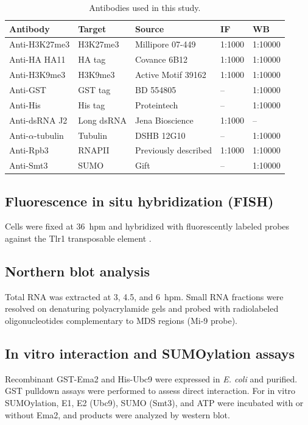 \documentclass[11pt,a4paper]{article}
\begin{document}
\begin{table}[htbp]
\centering
\caption{Antibodies used in this study.}
\label{tab:antibodies}
\small
\begin{tabular}{lllll}
\toprule
\textbf{Antibody} & \textbf{Target} & \textbf{Source} & \textbf{IF} & \textbf{WB} \\
\midrule
Anti-H3K27me3 & H3K27me3 & Millipore 07-449 & 1:1000 & 1:10000 \\
Anti-HA HA11 & HA tag & Covance 6B12 & 1:1000 & 1:10000 \\
Anti-H3K9me3 & H3K9me3 & Active Motif 39162 & 1:1000 & 1:10000 \\
Anti-GST & GST tag & BD 554805 & -- & 1:10000 \\
Anti-His & His tag & Proteintech & -- & 1:10000 \\
Anti-dsRNA J2 & Long dsRNA & Jena Bioscience & 1:1000 & -- \\
Anti-$\alpha$-tubulin & Tubulin & DSHB 12G10 & -- & 1:10000 \\
Anti-Rpb3 & RNAPII & Previously described & 1:1000 & 1:10000 \\
Anti-Smt3 & SUMO & Gift & -- & 1:10000 \\
\bottomrule
\end{tabular}
\end{table}

\subsection{Fluorescence in situ hybridization (FISH)}
Cells were fixed at 36~hpm and hybridized with fluorescently labeled probes against the Tlr1 transposable element \citep{Mochizuki2002}.

\subsection{Northern blot analysis}
Total RNA was extracted at 3, 4.5, and 6~hpm. Small RNA fractions were resolved on denaturing polyacrylamide gels and probed with radiolabeled oligonucleotides complementary to MDS regions (Mi-9 probe).

\subsection{In vitro interaction and SUMOylation assays}
Recombinant GST-Ema2 and His-Ubc9 were expressed in \textit{E. coli} and purified. GST pulldown assays were performed to assess direct interaction. For in vitro SUMOylation, E1, E2 (Ubc9), SUMO (Smt3), and ATP were incubated with or without Ema2, and products were analyzed by western blot.
\end{document}
